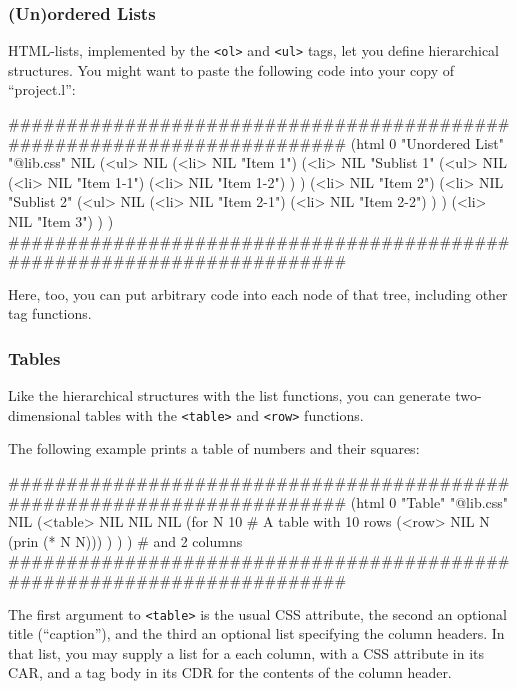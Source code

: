 \subsubsection{ (Un)ordered Lists}
\label{sec:appl-devel-(un)ordered-lists}%
HTML-lists, implemented by the \texttt{<ol>} and \texttt{<ul>} tags, let you define
hierarchical structures. You might want to paste the following code into
your copy of ``project.l'':


\begin{wideverbatim}
########################################################################
(html 0 "Unordered List" "@lib.css" NIL
   (<ul> NIL
      (<li> NIL "Item 1")
      (<li> NIL
         "Sublist 1"
         (<ul> NIL
            (<li> NIL "Item 1-1")
            (<li> NIL "Item 1-2") ) )
      (<li> NIL "Item 2")
      (<li> NIL
         "Sublist 2"
         (<ul> NIL
            (<li> NIL "Item 2-1")
            (<li> NIL "Item 2-2") ) )
      (<li> NIL "Item 3") ) )
########################################################################
\end{wideverbatim}

Here, too, you can put arbitrary code into each node of that tree,
including other tag functions.


\subsubsection{ Tables}
\label{sec:appl-devel-tables}%

Like the hierarchical structures with the list functions, you can
generate two-dimensional tables with the \texttt{<table>} and \texttt{<row>}
functions.

The following example prints a table of numbers and their squares:


\begin{wideverbatim}
########################################################################
(html 0 "Table" "@lib.css" NIL
   (<table> NIL NIL NIL
      (for N 10                                    # A table with 10 rows
         (<row> NIL N (prin (* N N))) ) ) )     # and 2 columns
########################################################################
\end{wideverbatim}

The first argument to \texttt{<table>} is the usual CSS attribute, the second
an optional title (``caption''), and the third an optional list specifying
the column headers. In that list, you may supply a list for a each
column, with a CSS attribute in its CAR, and a tag body in its CDR for
the contents of the column header.

